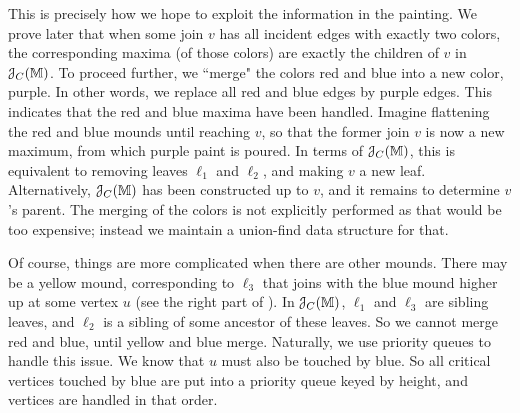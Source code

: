 {This is precisely how we hope to exploit the information in the painting. We prove later that
when some join $v$ has all incident edges with exactly two colors, the corresponding maxima (of those colors) are exactly
the children of $v$ in ${\cal J}_C(\mathbb{M})$. To proceed further, we ``merge" the colors red and blue into a new color, purple. In other words,
we replace all red and blue edges by purple edges. This indicates that the red and blue maxima have been
handled. Imagine flattening the red and blue mounds until reaching $v$, so that the former join $v$
is now a new maximum, from which purple paint is poured. In terms of ${\cal J}_C(\mathbb{M})$, this
is equivalent to removing leaves $\ell_1$ and $\ell_2$, and making $v$ a new leaf.
Alternatively, ${\cal J}_C(\mathbb{M})$ has been constructed up to $v$, and it remains to determine $v$'s parent.
The merging of the colors is not explicitly performed as that would be too expensive; instead we maintain a union-find
data structure for that.

Of course, things are more complicated when there are other mounds. There may be a yellow mound,
corresponding to $\ell_3$ that joins with the blue mound higher up at some vertex $u$ (see the right part of ). In ${\cal J}_C(\mathbb{M})$, $\ell_1$ and $\ell_3$
are sibling leaves, and $\ell_2$ is a sibling of some ancestor of these leaves. So we cannot
merge red and blue, until yellow and blue merge. Naturally, we use priority queues to handle this issue.
We know that $u$ must also be touched by blue. So all critical vertices touched by blue
are put into a priority queue keyed by height, and vertices are handled in that order.

}
